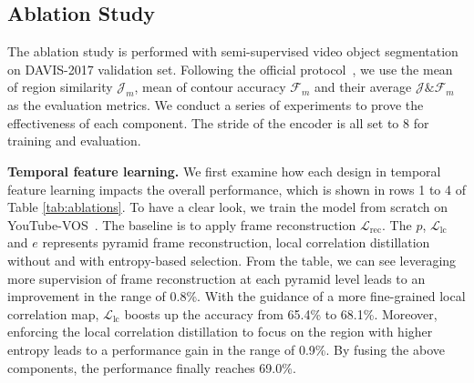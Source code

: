 \documentclass{article}
\begin{document}
 \subsection{Ablation Study}
 The ablation study is performed with semi-supervised video object segmentation~\cite{pont20172017} on DAVIS-2017 validation set. Following the official protocol~\cite{pont20172017}, we use the mean of region similarity $\mathcal{J}_m$, mean of contour accuracy $\mathcal{F}_m$ and their average $\mathcal{J} \& \mathcal{F}_m$ as the evaluation metrics. We conduct a series of experiments to prove the effectiveness of each component. The stride of the encoder is all set to 8 for training and evaluation.
 
 
 \textbf{Temporal feature learning.} We first examine how each design in temporal feature learning impacts the overall performance, which is shown in rows 1 to 4 of Table \ref{tab:ablations}. To have a clear look, we train the model from scratch on YouTube-VOS~\cite{xu2018youtube}. The baseline is to apply frame reconstruction $\mathcal{L}_{\mathrm{rec}}$. The $p$, $\mathcal{L}_{\mathrm{lc}}$ and $e$ represents pyramid frame reconstruction, local correlation distillation without and with entropy-based selection. From the table, we can see leveraging more supervision of frame reconstruction at each pyramid level leads to an improvement in the range of 0.8\%. With the guidance of a more fine-grained local correlation map, $\mathcal{L}_{\mathrm{lc}}$ boosts up the accuracy from 65.4\% to 68.1\%. Moreover, enforcing the local correlation distillation to focus on the region with higher entropy leads to a performance gain in the range of 0.9\%. By fusing the above components, the performance finally reaches 69.0\%.
 
\end{document}
